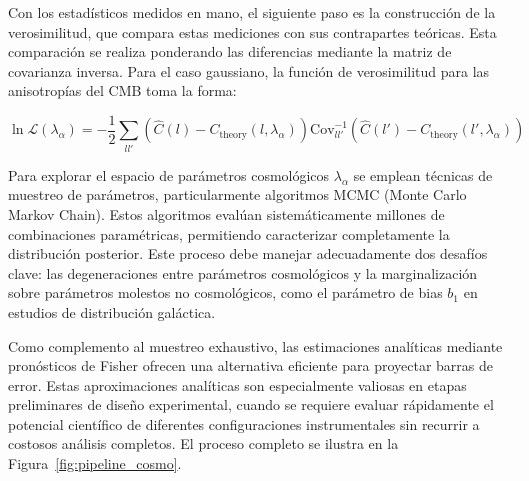 Con los estadísticos medidos en mano, el siguiente paso es la construcción de la verosimilitud, que compara estas mediciones con sus contrapartes teóricas. Esta comparación se realiza ponderando las diferencias mediante la matriz de covarianza inversa. Para el caso gaussiano, la función de verosimilitud para las anisotropías del CMB toma la forma:

\begin{equation}
\ln \mathcal{L}(\lambda_\alpha) = -\frac{1}{2} \sum_{ll'} \left( \hat{C}(l) - C_{\text{theory}}(l, \lambda_\alpha) \right) \text{Cov}^{-1}_{ll'} \left( \hat{C}(l') - C_{\text{theory}}(l', \lambda_\alpha) \right)
\end{equation}

Para explorar el espacio de parámetros cosmológicos $\lambda_\alpha$ se emplean técnicas de muestreo de parámetros, particularmente algoritmos MCMC (Monte Carlo Markov Chain). Estos algoritmos evalúan sistemáticamente millones de combinaciones paramétricas, permitiendo caracterizar completamente la distribución posterior. Este proceso debe manejar adecuadamente dos desafíos clave: las degeneraciones entre parámetros cosmológicos y la marginalización sobre parámetros molestos no cosmológicos, como el parámetro de bias $b_1$ en estudios de distribución galáctica.

Como complemento al muestreo exhaustivo, las estimaciones analíticas mediante pronósticos de Fisher ofrecen una alternativa eficiente para proyectar barras de error. Estas aproximaciones analíticas son especialmente valiosas en etapas preliminares de diseño experimental, cuando se requiere evaluar rápidamente el potencial científico de diferentes configuraciones instrumentales sin recurrir a costosos análisis completos. El proceso completo se ilustra en la Figura~\ref{fig:pipeline_cosmo}.



